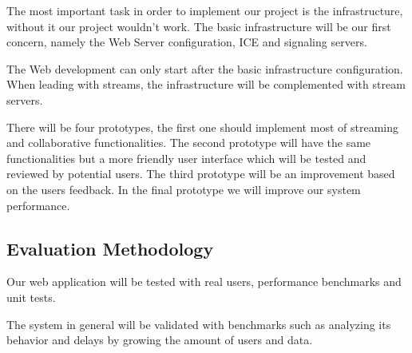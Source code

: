 

The most important task in order to implement our project is the infrastructure, without it our project wouldn't work. The basic infrastructure will be our first concern, namely the Web Server configuration, ICE and signaling servers. 

The Web development can only start after the basic infrastructure configuration. When leading with streams, the infrastructure will be complemented with stream servers.

There will be four prototypes, the first one should implement most of streaming and collaborative functionalities. The second prototype will have the same functionalities but a more friendly user interface which will be tested and reviewed by potential users. The third prototype will be an improvement based on the users feedback. In the final prototype we will improve our system performance. 


\subsection{Evaluation Methodology} %

Our web application will be tested with real users, performance benchmarks and unit tests.



The system in general will be validated with benchmarks such as analyzing its behavior and delays by growing the amount of users and data.
